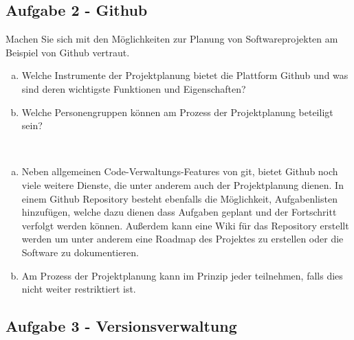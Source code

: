     
	\subsection{Aufgabe 2 - Github}
    
        \begin{aufgabe}
            Machen Sie sich mit den Möglichkeiten zur Planung von Softwareprojekten am Beispiel von Github vertraut.
            \\[-.7cm]\begin{enumerate}[(a)]
                \setlength\itemsep{0.1px}
                \item  Welche Instrumente der Projektplanung bietet die Plattform Github und was sind
                deren wichtigste Funktionen und Eigenschaften?
                \item Welche Personengruppen können am Prozess der Projektplanung beteiligt sein?

            \end{enumerate}
        \end{aufgabe}
    
        \begin{loesung}\:
            \\[-.7cm]\begin{enumerate}[(a)]
                \setlength\itemsep{0.1px}
                \item Neben allgemeinen Code-Verwaltungs-Features von git, bietet Github noch viele weitere Dienste, die unter anderem auch der Projektplanung dienen. In einem Github Repository besteht ebenfalls die Möglichkeit, Aufgabenlisten hinzufügen, welche dazu dienen dass Aufgaben geplant und der Fortschritt verfolgt werden können. Außerdem kann eine Wiki für das Repository erstellt werden um unter anderem eine Roadmap des Projektes zu erstellen oder die Software zu dokumentieren.
                \item Am Prozess der Projektplanung kann im Prinzip jeder teilnehmen, falls dies nicht weiter restriktiert ist.
            \end{enumerate}
        \end{loesung}
	
    
    \subsection{Aufgabe 3 - Versionsverwaltung}
    
